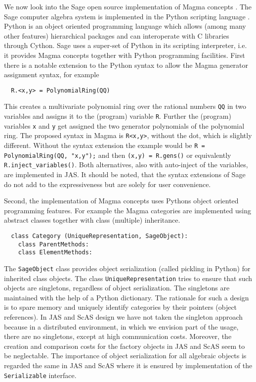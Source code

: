 \documentclass{llncs}
\newcommand{\code}[1]{\texttt{#1}}
\begin{document}
We now look into the Sage open source implementation of Magma concepts
\cite{Stein:2005,SageWiki:2009}.  The Sage computer algebra system is
implemented in the Python scripting language \cite{vanRossum:1991}.
Python is an object oriented programming language which allows (among
many other features) hierarchical packages and can interoperate with C
libraries through Cython. Sage uses a super-set of Python in its
scripting interpreter, i.e. it provides Magma concepts together with
Python programming facilities. First there is a notable extension to
the Python syntax to allow the Magma generator assignment syntax, for
example
\begin{verbatim}
  R.<x,y> = PolynomialRing(QQ)
\end{verbatim}
This creates a multivariate polynomial ring over the rational numbers
\code{QQ} in two variables and assigns it to the (program) variable
\code{R}. Further the (program) variables \code{x} and \code{y} get
assigned the two generator polynomials of the polynomial ring. The
proposed syntax in Magma is \code{R<x,y>}, without the dot, which is
slightly different.  Without the syntax extension the example
would be \code{R = Poly\-nomial\-Ring(QQ, "x,y");} and then \code{(x,y) = R.\-gens()}
or equivalently \code{R.in\-ject\-\_variables()}.
Both alternatives, also with auto-inject of the variables, are implemented in JAS.
It should be noted, that the syntax extensions of Sage do not add to
the expressiveness but are solely for user convenience.

Second, the implementation of Magma concepts uses Pythons object oriented
programming features. For example the Magma categories are implemented
using abstract classes together with class (multiple) inheritance.
\begin{verbatim}
  class Category (UniqueRepresentation, SageObject):
    class ParentMethods:
    class ElementMethods:
\end{verbatim}
The \code{SageObject} class provides object serialization (called
pickling in Python) for inherited class objects. The class
\code{UniqueRepresentation} tries to ensure that such objects are
singletons, regardless of object serialization. The singletons are
maintained with the help of a Python dictionary.  The rationale for
such a design is to spare memory and uniquely identify categories by
their pointers (object references). 
%
In JAS and ScAS design we have not taken the singleton approach
because in a distributed environment, in which we envision part of the
usage, there are no singletons, except at high communication costs.
Moreover, the creation and comparison costs for the factory objects in
JAS and ScAS seem to be neglectable. The importance of object
serialization for all algebraic objects is regarded the same in JAS and
ScAS where it is ensured by implementation of the \code{Serializable}
interface.
\end{document}
